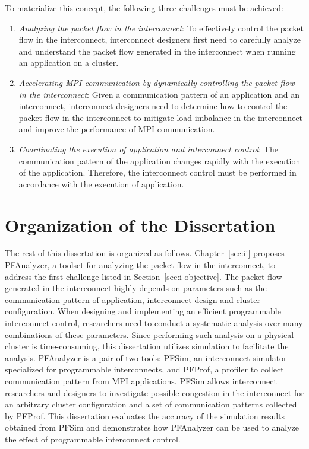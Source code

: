 To materialize this concept, the following three challenges must be achieved:

\begin{enumerate}
\item \emph{Analyzing the packet flow in the interconnect}:
    To effectively control the packet flow in the interconnect, interconnect
    designers first need to carefully analyze and understand the packet flow
    generated in the interconnect when running an application on a cluster.
\item \emph{Accelerating MPI communication by dynamically controlling the
    packet flow in the interconnect}:
    Given a communication pattern of an application and an interconnect,
    interconnect designers need to determine how to control the packet flow in
    the interconnect to mitigate load imbalance in the interconnect and
    improve the performance of MPI communication.
\item \emph{Coordinating the execution of application and interconnect control}:
    The communication pattern of the application changes rapidly with the
    execution of the application. Therefore, the interconnect control must
    be performed in accordance with the execution of application.
\end{enumerate}

\section{Organization of the Dissertation}

The rest of this dissertation is organized as follows.
Chapter~\ref{sec:ii} proposes PFAnalyzer, a toolset for analyzing the
packet flow in the interconnect, to address the first challenge listed in
Section~\ref{sec:i-objective}. The packet flow generated in the interconnect
highly depends on parameters such as the communication pattern of application,
interconnect design and cluster configuration. When designing and implementing
an efficient programmable interconnect control, researchers need to conduct a
systematic analysis over many combinations of these parameters. Since
performing such analysis on a physical cluster is time-consuming, this
dissertation utilizes simulation to facilitate the analysis. PFAnalyzer is a
pair of two tools: PFSim, an interconnect simulator specialized for
programmable interconnects, and PFProf, a profiler to collect communication
pattern from MPI applications. PFSim allows interconnect researchers and
designers to investigate possible congestion in the interconnect for an
arbitrary cluster configuration and a set of communication patterns collected
by PFProf. This dissertation evaluates the accuracy of the simulation results
obtained from PFSim and demonstrates how PFAnalyzer can be used to analyze the
effect of programmable interconnect control.

